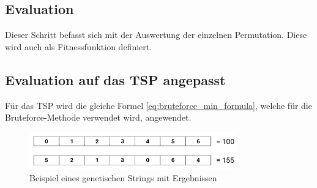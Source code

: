 %
%
%
%
\subsection{Evaluation
\label{buch:paper:varalg:subsection:evaluation}}
Dieser Schritt befasst sich mit der Auswertung der einzelnen 
Permutation. Diese wird auch als Fitnessfunktion definiert.

\subsection{Evaluation auf das TSP angepasst
\label{buch:paper:varalg:subsection:evaluation_tsp}}
Für das TSP wird die gleiche Formel \ref{eq:bruteforce_min_formula},
welche für die Bruteforce-Methode verwendet wird, angewendet.
\begin{figure}
	\centering
	\includegraphics[width=0.8\textwidth]{
        papers/varalg/images/teil3/03GeneticStringCitiesResults.png
        }
	\caption{Beispiel eines genetischen Strings mit Ergebnissen}
	\label{fig:cities_genetic_string_results}
\end{figure}
